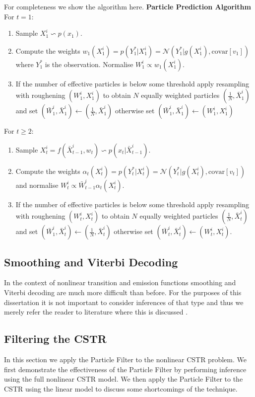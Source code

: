 \documentclass[../masters.tex]{subfiles}
\begin{document}
For completeness we show the algorithm here.
\textbf{Particle Prediction Algorithm}\\
For $t=1$:
\begin{enumerate}
\item
Sample $X^i_1 \backsim p(x_1)$.
\item
Compute the weights $w_1(X_1^i) = p(Y^*_1|X_1^i) = \mathcal{N}(Y^*_1|g(X^i_1), \text{covar}[v_1])$ where $Y^*_1$ is the observation. Normalise $W^i_1 \propto w_1(X^i_1)$.
\item
If the number of effective particles is below some threshold apply resampling with roughening $(W^i_1, X^i_1)$ to obtain $N$ equally weighted particles $(\frac{1}{N}, \bar{X}^i_1)$ and set $(\bar{W}^i_1, \bar{X}^i_1) \leftarrow (\frac{1}{N}, \bar{X}^i_1)$ otherwise set $(\bar{W}^i_1, \bar{X}^i_1) \leftarrow ({W}^i_1, {X}^i_1)$
\end{enumerate}
For $t \geq 2$:
\begin{enumerate}
\item
Sample $X^i_t = f(\bar{X}^i_{t-1}, w_t) \backsim p(x_t|\bar{X}^i_{t-1})$.
\item
Compute the weights $\alpha_t(X^i_{t}) = p(Y^*_t|X_t^i) = \mathcal{N}(Y^*_t|g(X^i_t), \text{covar}[v_t])$ and normalise $W^i_t \propto \bar{W}^i_{t-1}\alpha_t(X^i_{t})$.
\item
If the number of effective particles is below some threshold apply resampling with roughening $(W^i_t, X^i_{t})$ to obtain $N$ equally weighted particles $(\frac{1}{N}, \bar{X}^i_{t})$ and set $(\bar{W}^i_1, \bar{X}^i_t) \leftarrow (\frac{1}{N}, \bar{X}^i_t)$ otherwise set $(\bar{W}^i_t, \bar{X}^i_t) \leftarrow ({W}^i_t, {X}^i_t)$.
\end{enumerate}
 

\subsection{Smoothing and Viterbi Decoding}
In the context of nonlinear transition and emission functions smoothing and Viterbi decoding are much more difficult than before. For the purposes of this dissertation it is not important to consider inferences of that type and thus we merely refer the reader to literature where this is discussed \cite{pftut}\cite{gsf1}\cite{murphy1}\cite{murphy2}\cite{barber}.

\subsection{Filtering the CSTR}
In this section we apply the Particle Filter to the nonlinear CSTR problem. We first demonstrate the effectiveness of the Particle Filter by performing inference using the full nonlinear CSTR model. We then apply the Particle Filter to the CSTR using the linear model to discuss some shortcomings of the technique.
\end{document}
